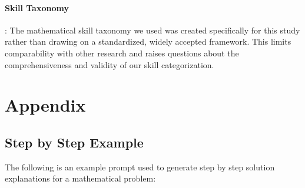 \documentclass[11pt]{article}
\begin{document}
\paragraph{Skill Taxonomy}: The mathematical skill taxonomy we used was created specifically for this study rather than drawing on a standardized, widely accepted framework. This limits comparability with other research and raises questions about the comprehensiveness and validity of our skill categorization.



\appendix

\section{Appendix}

\subsection{Step by Step Example}
\label{sec:step-by-step-example}
The following is an example prompt used to generate step by step solution explanations for a mathematical problem:
\end{document}
